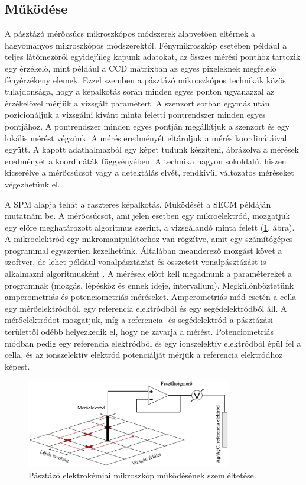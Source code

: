 \subsection{Működése}
A pásztázó mérőcsúcs mikroszkópos módszerek alapvetően eltérnek a hagyományos mikroszkópos módszerektől. Fénymikroszkóp esetében például a teljes látómezőről egyidejűleg kapunk adatokat, az összes mérési ponthoz tartozik egy érzékelő, mint például a CCD mátrixban az egyes pixeleknek megfelelő fényérzékeny elemek. Ezzel szemben a pásztázó mikroszkópos technikák közös tulajdonsága, hogy a képalkotás során minden egyes ponton ugyanazzal az érzékelővel mérjük a vizsgált paramétert. A szenzort sorban egymás után pozícionáljuk a vizsgálni kívánt minta feletti pontrendszer minden egyes pontjához. A pontrendszer minden egyes pontján megállítjuk a szenzort és egy lokális mérést végzünk. A mérés eredményét eltároljuk a mérés koordinátáival együtt. A kapott adathalmazból egy képet tudunk készíteni, ábrázolva a mérések eredményét a koordináták függvényében. A technika nagyon sokoldalú, hiszen kicserélve a mérőcsúcsot vagy a detektálás elvét, rendkívül változatos méréseket végezhetünk el. 

A SPM alapja tehát a raszteres képalkotás. Működését a SECM példáján mutatnám be. A mérőcsúcsot, ami jelen esetben egy mikroelektród, mozgatjuk egy előre meghatározott algoritmus szerint, a vizsgálandó minta felett (\ref{fig:PEKM}. ábra). A mikroelektród egy mikromanipulátorhoz van rögzítve, amit egy számítógépes programmal egyszerűen kezelhetünk. Általában meanderező mozgást követ a szoftver, de lehet például vonalpásztázást és összetett vonalpásztázást is alkalmazni algoritmusként \cite{kiss2014new}. A mérések előtt kell megadnunk a paramétereket a programnak (mozgás, lépésköz és ennek ideje, intervallum). Megkülönböztetünk amperometriás és potenciometriás méréseket. Amperometriás mód esetén a cella egy mérőelektródból, egy referencia elektródból és egy segédelektródból áll. A mérőelektródot mozgatjuk, míg a referencia- és segédelektród a pásztázási területtől odébb helyezkedik el, hogy ne zavarja a mérést. Potenciometriás módban pedig egy referencia elektródból és egy ionszelektív elektródból épül fel a cella, és az ionszelektív elektród potenciálját mérjük a referencia elektródhoz képest.

\begin{figure}
\centering
\includegraphics[width=0.8\textwidth]{img/spm.eps}
\caption{Pásztázó elektrokémiai mikroszkóp működésének szemléltetése.}
\label{fig:PEKM}
\end{figure}

